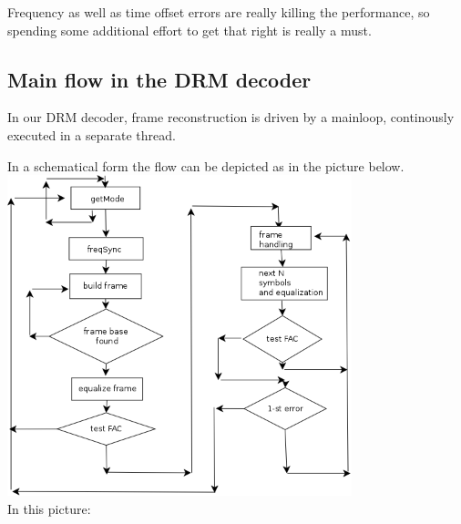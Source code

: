 \documentclass[11pt]{article}
\begin{document}
Frequency as well as time offset errors are really killing the performance,
so spending some additional effort to get that right is really a must.
\subsection{Main flow in the DRM decoder}
In our DRM decoder, frame reconstruction is driven by a mainloop,
continously executed in a separate thread.

In
a schematical form the flow can be depicted as in the picture below.
\ \\
\includegraphics[width=100mm]{flowvoordrm.png}
\ \\
In this picture:
\end{document}
